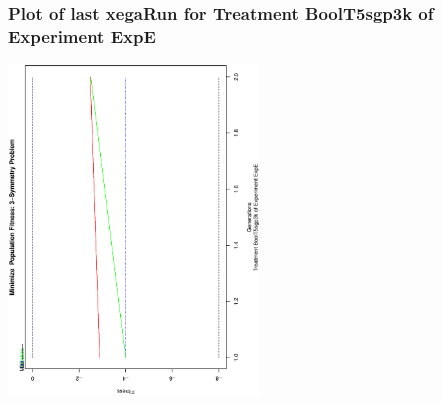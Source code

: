  \begin{frame}
 \frametitle{ Plot of last xegaRun for Treatment BoolT5sgp3k of Experiment ExpE }
 \begin{center}
\includegraphics[width=0.5\textwidth, angle=-90]
{ExpEPlotPopStatsFigure006.eps}
 \end{center}
 \label{report/ExpEPlotPopStatsFigure006.eps}  
 \end{frame}

